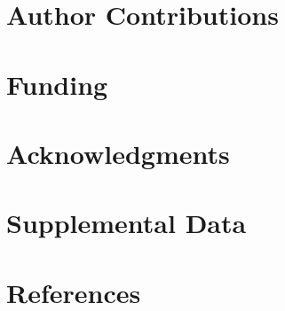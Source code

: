 \documentclass[utf8]{frontiersSCNS} %
\begin{document}
\section*{Author Contributions}


\section*{Funding}

\section*{Acknowledgments}

\section*{Supplemental Data}
%
%
\section*{References}

\end{document}
